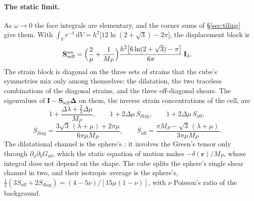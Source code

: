 \documentclass[11pt,a4paper]{article}
\newcommand{\bD}{\boldsymbol{\Delta}}
\newcommand{\bI}{\mathbf{I}}
\newcommand{\bS}{\mathbf{S}}
\newcommand{\dd}{\mathrm{d}}
\begin{document}
\paragraph{The static limit.} As $\omega\to0$ the face integrals are elementary, and the corner sums of
\S\ref{sec:tiling} give them. With $\int_V r^{-1}\,\dd V=h^2\bigl[12\ln(2+\sqrt3)-2\pi\bigr]$, the
displacement block is
\begin{equation}\label{eq:pointSuu}
  \bS^{uu}_{\text{self}}=\Bigl(\frac{2}{\mu}+\frac{1}{M_P}\Bigr)\frac{h^2\bigl[6\ln(2+\sqrt3)-\pi\bigr]}{6\pi}\,\bI_3 .
\end{equation}
The strain block is diagonal on the three sets of strains that the cube's symmetries mix only among
themselves: the dilatation, the two traceless combinations of the diagonal strains, and the three
off-diagonal shears. The eigenvalues of $\bI-\bS_{\text{self}}\bD$ on them, the inverse strain
concentrations of the cell, are
\begin{equation}\label{eq:pointchannels}
  1+\frac{\Delta\lambda+\tfrac23\Delta\mu}{M_P},
  \qquad 1+2\Delta\mu\,S_{\text{diag}},
  \qquad 1+2\Delta\mu\,S_{\text{off}},
\end{equation}
\begin{equation*}
  S_{\text{diag}}=\frac{3\sqrt3\,(\lambda+\mu)+2\pi\mu}{6\pi\mu M_P},
  \qquad
  S_{\text{off}}=\frac{\pi M_P-\sqrt3\,(\lambda+\mu)}{3\pi\mu M_P}.
\end{equation*}
The dilatational channel is the sphere's \citep{Eshelby1957}: it involves the Green's tensor only through
$\partial_a\partial_bG_{ab}$, which the static equation of motion makes $-\delta(\mathbf r)/M_P$, whose
integral does not depend on the shape. The cube splits the sphere's single shear channel in two, and their
isotropic average is the sphere's, $\tfrac15(3S_{\text{off}}+2S_{\text{diag}})=(4-5\nu)/[15\mu(1-\nu)]$, with
$\nu$ Poisson's ratio of the background.
\end{document}
